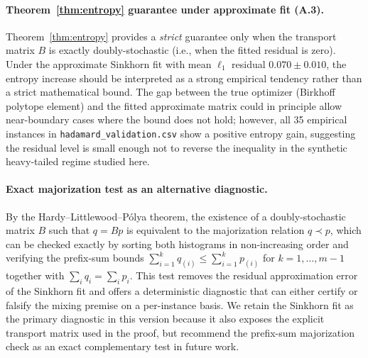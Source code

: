 \paragraph{Theorem~\ref{thm:entropy} guarantee under approximate fit (A.3).}
Theorem~\ref{thm:entropy} provides a \emph{strict} guarantee only when the transport matrix \(B\) is exactly doubly-stochastic (i.e., when the fitted residual is zero). Under the approximate Sinkhorn fit with mean \(\ell_1\) residual \(0.070 \pm 0.010\), the entropy increase should be interpreted as a strong empirical tendency rather than a strict mathematical bound. The gap between the true optimizer (Birkhoff polytope element) and the fitted approximate matrix could in principle allow near-boundary cases where the bound does not hold; however, all 35 empirical instances in \texttt{hadamard\_validation.csv} show a positive entropy gain, suggesting the residual level is small enough not to reverse the inequality in the synthetic heavy-tailed regime studied here.

\paragraph{Exact majorization test as an alternative diagnostic.}
By the Hardy--Littlewood--P\'olya theorem, the existence of a doubly-stochastic matrix $B$ such that $q=Bp$ is equivalent to the majorization relation $q\prec p$, which can be checked exactly by sorting both histograms in non-increasing order and verifying the prefix-sum bounds $\sum_{i=1}^{k}q_{(i)}\le \sum_{i=1}^{k}p_{(i)}$ for $k=1,\ldots,m-1$ together with $\sum_{i}q_i=\sum_{i}p_i$. This test removes the residual approximation error of the Sinkhorn fit and offers a deterministic diagnostic that can either certify or falsify the mixing premise on a per-instance basis. We retain the Sinkhorn fit as the primary diagnostic in this version because it also exposes the explicit transport matrix used in the proof, but recommend the prefix-sum majorization check as an exact complementary test in future work.

